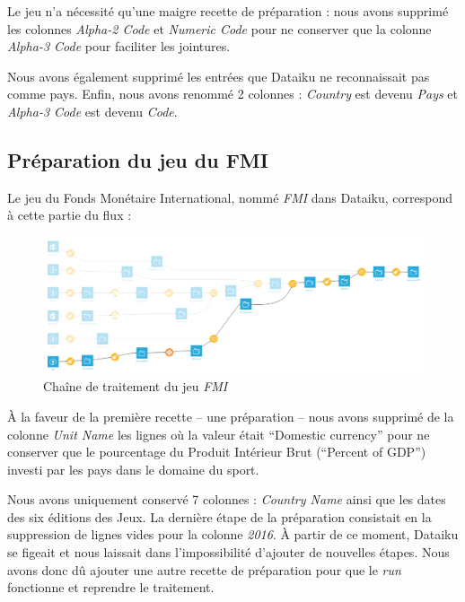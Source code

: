 \documentclass[hidelinks, 12pt]{report}
\begin{document}
Le jeu n'a nécessité qu'une maigre recette de préparation : nous avons supprimé les colonnes \textit{Alpha-2 Code} et \textit{Numeric Code} pour ne conserver que la colonne \textit{Alpha-3 Code} pour faciliter les jointures.

Nous avons également supprimé les entrées que Dataiku ne reconnaissait pas comme pays. Enfin, nous avons renommé 2 colonnes : \textit{Country} est devenu \textit{Pays} et \textit{Alpha-3 Code} est devenu \textit{Code}.





%





\subsection{Préparation du jeu du FMI}

Le jeu du Fonds Monétaire International, nommé \textit{FMI} dans Dataiku, correspond à cette partie du flux :

\begin{center}
	\begin{figure}[H]
		\setlength{\belowcaptionskip}{-35pt}
		\includegraphics[scale=0.35]{images/flow-medals-fmi.png}
		\caption{Chaîne de traitement du jeu \textit{FMI}}
	\end{figure}
\end{center}

À la faveur de la première recette -- une préparation -- nous avons supprimé de la colonne \textit{Unit Name} les lignes où la valeur était \enquote{Domestic currency} pour ne conserver que le pourcentage du Produit Intérieur Brut (\enquote{Percent of GDP}) investi par les pays dans le domaine du sport.

Nous avons uniquement conservé 7 colonnes : \textit{Country Name} ainsi que les dates des six éditions des Jeux. La dernière étape de la préparation consistait en la suppression de lignes vides pour la colonne \textit{2016}. À partir de ce moment, Dataiku se figeait et nous laissait dans l'impossibilité d'ajouter de nouvelles étapes. Nous avons donc dû ajouter une autre recette de préparation pour que le \textit{run} fonctionne et reprendre le traitement.
\end{document}
